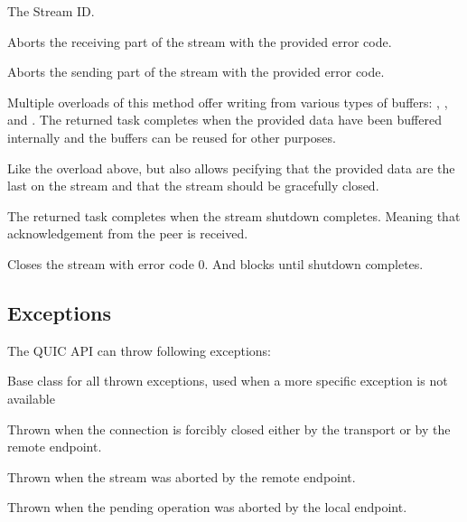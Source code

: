 \begin{description}

     The Stream ID\@.

     Aborts the receiving part of the stream with the provided error code.

     Aborts the sending part of the stream with the provided error code.

     Multiple overloads of this method offer writing from various types of buffers: , , and . The returned task completes when the provided data have been buffered internally and the buffers can be reused for other purposes.

     Like the overload above, but also allows pecifying that the provided data are the last on the stream and that the stream should be gracefully closed.

     The returned task completes when the stream shutdown completes. Meaning that acknowledgement from the peer is received.

     Closes the stream with error code 0. And blocks until shutdown completes.

\end{description}

\subsection{Exceptions}

The QUIC API can throw following exceptions:

\begin{description}

     Base class for all thrown exceptions, used when a more specific exception is not available

     Thrown when the connection is forcibly closed either by the transport or by the remote endpoint.

     Thrown when the stream was aborted by the remote endpoint.

     Thrown when the pending operation was aborted by the local endpoint.

\end{description}

